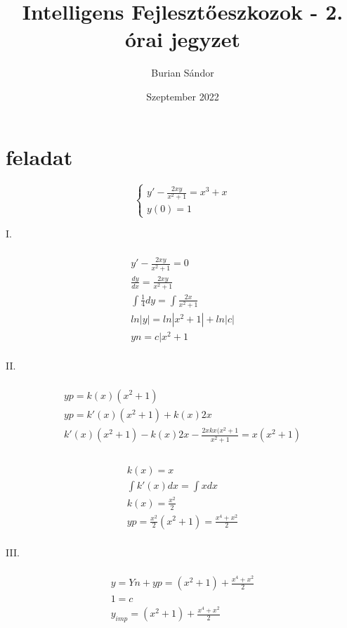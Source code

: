 \documentclass{article}
\title{Intelligens Fejlesztőeszkozok - 2. órai jegyzet}
\author{Burian Sándor}
\date{Szeptember 2022}
\begin{document}
\maketitle

\section{feladat}
\begin{equation}
   \begin{cases}
      y'-\frac{2xy}{x^{2}+1}=x^{3}+x\\
	  y(0)=1
    \end{cases}       
\end{equation}

I.

\begin{multline}
\\
y'-\frac{2xy}{x^{2}+1} = 0 \\
\frac{dy}{dx} = \frac{2xy}{x^{2}+1} \\
\int \frac{1}{4}dy = \int \frac{2x}{x^{2}+1}\\
ln|y| = ln|x^{2}+1|+ln|c| \\
yn = c|x^{2}+1 \\
\end{multline}

II.

\begin{multline}
\\
yp=k(x)(x^{2}+1) \\
yp=k'(x)(x^{2}+1)+k(x)2x \\
k'(x)(x^{2}+1)-k(x)2x-\frac{2xkx(x^{2}+1}{x^{2}+1} = x(x^{2}+1) \\
\end{multline}

\begin{multline}
\\
k(x)=x \\
\int k'(x)dx = \int x dx \\
k(x) = \frac{x^{2}}{2} \\
yp = \frac{x^{2}}{2}(x^{2}+1)=\frac{x^{4}+x^{2}}{2} \\
\end{multline}

III.

\begin{multline}
\\
y = Yn + yp = (x^{2}+1) + \frac{x^{4}+x^{2}}{2} \\
1= c \\
y_{imp} =  (x^{2}+1) + \frac{x^{4}+x^{2}}{2} \\
\end{multline}
\end{document}
